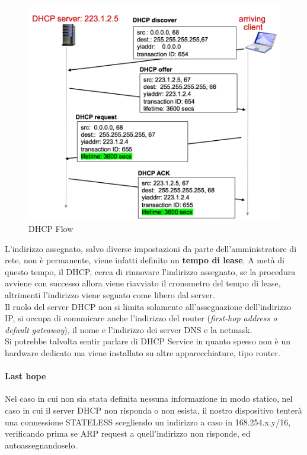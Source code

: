 \documentclass[12pt]{article}
\begin{document}
\begin{figure}[!hbpt]
  \includegraphics[width=\textwidth]{images/dhcp.png}
  \caption{DHCP Flow}
  \label{fig:dhcp}
\end{figure}

L'indirizzo assegnato, salvo diverse impostazioni da parte dell'amministratore di rete, non è permanente, viene infatti definito un \textbf{tempo di lease}. A metà di questo tempo, il DHCP, cerca di rinnovare l'indirizzo assegnato, se la procedura avviene con successo allora viene riavviato il cronometro del tempo di lease, altrimenti l'indirizzo viene segnato come libero dal server.\\
Il ruolo del server DHCP non si limita solamente all'assegnazione dell'indirizzo IP, si occupa di comunicare anche l'indirizzo del router (\textit{first-hop address o default gateaway}), il nome e l'indirizzo dei server DNS e la netmask.\\
Si potrebbe talvolta sentir parlare di DHCP Service in quanto spesso non è un hardware dedicato ma viene installato su altre apparecchiature, tipo router.

\paragraph{Last hope} Nel caso in cui non sia stata definita nessuna informazione in modo statico, nel caso in cui il server DHCP non risponda o non esista, il nostro dispositivo tenterà una connessione STATELESS scegliendo un indirizzo a caso in 168.254.x.y/16, verificando prima se ARP request a quell'indirizzo non risponde, ed autoassegnandoselo.
\end{document}
